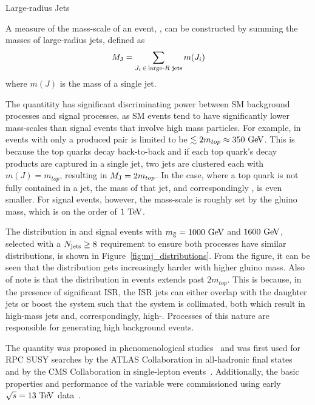 \begin{section}{Large-radius Jets}
\begin{subsection}{\MJ}
\label{subsec:MJ}

A measure of the mass-scale of an event, \MJ, can be constructed by summing the masses of large-radius jets, defined as
\begin{align}
M_{\mathrm{J}} = \sum_{J_{i}\, \in\, {\text{large-}R\text{ jets}}} m(J_i)
\end{align}
where $m(J)$ is the mass of a single \largeR jet.

The quantitity \MJ has significant discriminating power between SM background processes and signal processes, as SM events tend to have significantly lower mass-scales than signal events that involve high mass particles.
For example, \MJ in events with only a produced \ttbar pair is limited to be $\lesssim 2m_{top} \approx 350~\mathrm{Ge\kern -0.1em V}$.
This is because the top quarks decay back-to-back and if each top quark's decay products are captured in a single \largeR jet, two \largeR jets are clustered each with $m(J) = m_{top}$, resulting in $M_{\mathrm{J}} = 2m_{top}$.
In the case, where a top quark is not fully contained in a \largeR jet, the mass of that \largeR jet, and correspondingly \MJ, is even smaller.
For signal events, however, the mass-scale is roughly set by the gluino mass, which is on the order of $1~\mathrm{Te\kern -0.1em V}$.

The \MJ distribution in \ttbar and signal events with $m_{\tilde{\mathrm{g}}} = 1000~\mathrm{Ge\kern -0.1em V}$ and $1600~\mathrm{Ge\kern -0.1em V}$, selected with a $N_{\mathrm{jets}} \geq 8$ requirement to ensure both processes have similar \Njets distributions, is shown in Figure~\ref{fig:mj_distributions}. 
From the figure, it can be seen that the \MJ distribution gets increasingly harder with higher gluino mass.
Also of note is that the \MJ distribution in \ttbar events extends past $2m_{top}$.
This is because, in the presence of significant ISR, the ISR jets can either overlap with the \ttbar daughter jets or boost the \ttbar system such that the system is collimated, both which result in high-mass \largeR jets and, correspondingly, high-\MJ.
Processes of this nature are responsible for generating high \MJ background events.

The quantity \MJ was proposed in phenomenological studies~\cite{Hook:2012fd,Cohen:2012yc,Hedri:2013pvl} and was first used for RPC SUSY searches by the ATLAS Collaboration in all-hadronic final states~\cite{Aad:2015lea,Aad:2013wta} and by the CMS Collaboration in single-lepton events~\cite{Khachatryan:2016uwr,Sirunyan:2017fsj}.
Additionally, the basic properties and performance of the \MJ variable were commissioned using early $\sqrt{s} = 13~\mathrm{Te\kern -0.1em V}$ data~\cite{CMS-DP-2015-035}.


\end{subsection}
\end{section}

